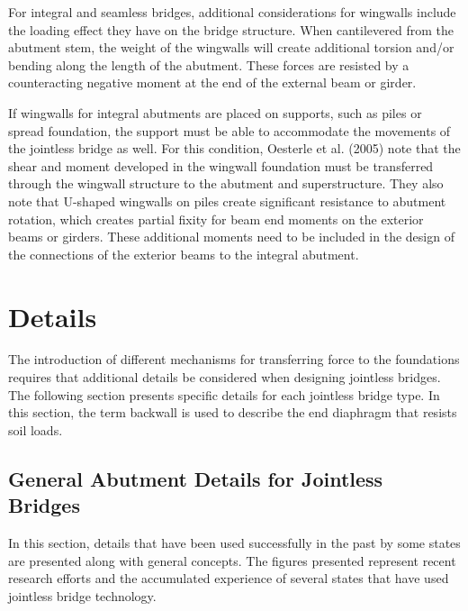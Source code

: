 For integral and seamless bridges, additional considerations for wingwalls include the loading effect they have on the bridge structure. When cantilevered from the abutment stem, the weight of the wingwalls will create additional torsion and/or bending along the length of the abutment. These forces are resisted by a counteracting negative moment at the end of the external beam or girder.

If wingwalls for integral abutments are placed on supports, such as piles or spread foundation, the support must be able to accommodate the movements of the jointless bridge as well. For this condition, Oesterle et al. (2005) note that the shear and moment developed in the wingwall foundation must be transferred through the wingwall structure to the abutment and superstructure. They also note that U-shaped wingwalls on piles create significant resistance to abutment rotation, which creates partial fixity for beam end moments on the exterior beams or girders. These additional moments need to be included in the design of the connections of the exterior beams to the integral abutment.

\section{Details}
The introduction of different mechanisms for transferring force to the foundations requires that additional details
be considered when designing jointless bridges. The following section presents specific details for each jointless
bridge type. In this section, the term backwall is used to describe the end diaphragm that resists soil loads.

\subsection{General Abutment Details for Jointless Bridges}
In this section, details that have been used successfully in the past by some states are presented along with general
concepts. The figures presented represent recent research efforts and the accumulated experience of several states that
have used jointless bridge technology.

